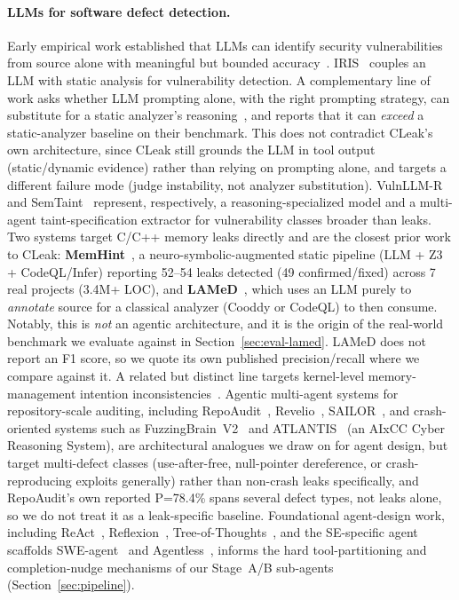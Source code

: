 \documentclass[11pt,a4paper]{article}
\begin{document}
\paragraph{LLMs for software defect detection.}
Early empirical work established that LLMs can identify security
vulnerabilities from source alone with meaningful but bounded
accuracy~\cite{llm-vuln-eval}. IRIS~\cite{iris} couples an LLM with static
analysis for vulnerability detection. A complementary line of work asks
whether LLM prompting alone, with the right prompting strategy, can
substitute for a static analyzer's reasoning~\cite{llm-proxy-static}, and
reports that it can \emph{exceed} a static-analyzer baseline on their
benchmark. This does not contradict CLeak's own architecture, since
CLeak still grounds the LLM in tool output (static/dynamic evidence) rather
than relying on prompting alone, and targets a different failure mode
(judge instability, not analyzer substitution). VulnLLM-R~\cite{vulnllmr}
and SemTaint~\cite{semtaint}
represent, respectively, a reasoning-specialized model and a multi-agent
taint-specification extractor for vulnerability classes broader than
leaks. Two systems target C/C++ memory leaks directly and are the closest
prior work to CLeak: \textbf{MemHint}~\cite{memhint}, a
neuro-symbolic-augmented static pipeline (LLM + Z3 + CodeQL/Infer) reporting
52--54 leaks detected (49 confirmed/fixed) across 7 real projects (3.4M+ LOC),
and
\textbf{LAMeD}~\cite{lamed}, which uses an LLM purely to \emph{annotate}
source for a classical analyzer (Cooddy or CodeQL) to then consume.
Notably, this is \emph{not} an agentic architecture, and it is the origin of
the real-world benchmark we evaluate against in
Section~\ref{sec:eval-lamed}. LAMeD does not report an F1 score, so we quote
its own published precision/recall where we compare against it.
A related but distinct line targets kernel-level memory-management
intention inconsistencies~\cite{kernel-memmgmt}.
Agentic multi-agent systems for repository-scale auditing, including
RepoAudit~\cite{repoaudit}, Revelio~\cite{revelio}, SAILOR~\cite{sailor},
and crash-oriented systems such as FuzzingBrain~V2~\cite{fuzzingbrainv2}
and ATLANTIS~\cite{atlantis} (an AIxCC Cyber Reasoning System), are
architectural analogues we draw on for agent design, but target
multi-defect classes (use-after-free, null-pointer dereference, or
crash-reproducing exploits generally) rather than non-crash leaks
specifically, and RepoAudit's own reported P=78.4\% spans several defect
types, not leaks alone, so we do not treat it as a leak-specific baseline.
Foundational agent-design work, including ReAct~\cite{react},
Reflexion~\cite{reflexion}, Tree-of-Thoughts~\cite{tot}, and the
SE-specific agent scaffolds SWE-agent~\cite{sweagent} and
Agentless~\cite{agentless}, informs the hard tool-partitioning and
completion-nudge mechanisms of our Stage~A/B sub-agents
(Section~\ref{sec:pipeline}).
\end{document}
